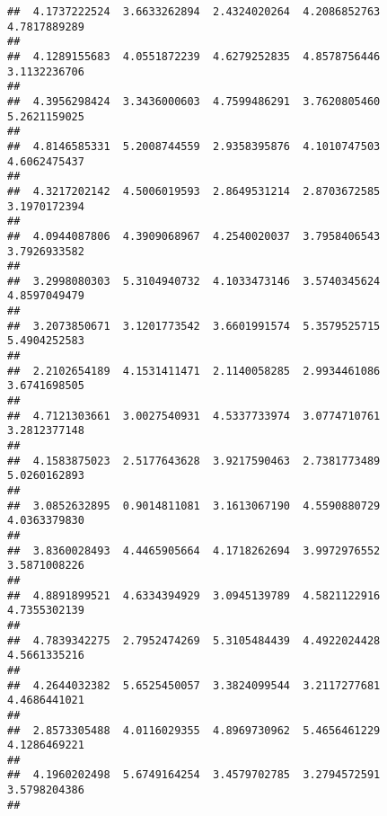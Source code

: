 \documentclass[]{article}
\begin{document}
\begin{verbatim}
##  4.1737222524  3.6633262894  2.4324020264  4.2086852763  4.7817889289 
##                                                                       
##  4.1289155683  4.0551872239  4.6279252835  4.8578756446  3.1132236706 
##                                                                       
##  4.3956298424  3.3436000603  4.7599486291  3.7620805460  5.2621159025 
##                                                                       
##  4.8146585331  5.2008744559  2.9358395876  4.1010747503  4.6062475437 
##                                                                       
##  4.3217202142  4.5006019593  2.8649531214  2.8703672585  3.1970172394 
##                                                                       
##  4.0944087806  4.3909068967  4.2540020037  3.7958406543  3.7926933582 
##                                                                       
##  3.2998080303  5.3104940732  4.1033473146  3.5740345624  4.8597049479 
##                                                                       
##  3.2073850671  3.1201773542  3.6601991574  5.3579525715  5.4904252583 
##                                                                       
##  2.2102654189  4.1531411471  2.1140058285  2.9934461086  3.6741698505 
##                                                                       
##  4.7121303661  3.0027540931  4.5337733974  3.0774710761  3.2812377148 
##                                                                       
##  4.1583875023  2.5177643628  3.9217590463  2.7381773489  5.0260162893 
##                                                                       
##  3.0852632895  0.9014811081  3.1613067190  4.5590880729  4.0363379830 
##                                                                       
##  3.8360028493  4.4465905664  4.1718262694  3.9972976552  3.5871008226 
##                                                                       
##  4.8891899521  4.6334394929  3.0945139789  4.5821122916  4.7355302139 
##                                                                       
##  4.7839342275  2.7952474269  5.3105484439  4.4922024428  4.5661335216 
##                                                                       
##  4.2644032382  5.6525450057  3.3824099544  3.2117277681  4.4686441021 
##                                                                       
##  2.8573305488  4.0116029355  4.8969730962  5.4656461229  4.1286469221 
##                                                                       
##  4.1960202498  5.6749164254  3.4579702785  3.2794572591  3.5798204386 
##                                                                       

\end{verbatim}
\end{document}
